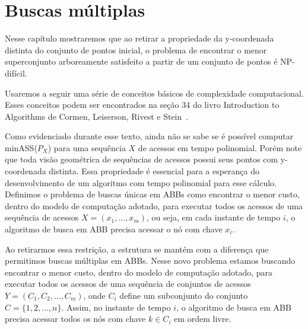 
\chapter{Buscas múltiplas}
\label{cap:buscas-multiplas}




\newtheorem*{kuratowski}{Teorema de Kuratowski (1930)}


Nesse capítulo mostraremos que ao retirar a propriedade da y-coordenada distinta do conjunto de pontos inicial, o problema de encontrar o menor superconjunto arboreamente satisfeito a partir de um conjunto de pontos é NP-difícil. 

Usaremos a seguir uma série de conceitos básicos de complexidade computacional. Esses conceitos podem ser encontrados na seção 34 do livro Introduction to Algorithms de Cormen, Leiserson, Rivest e Stein~\cite{CLRS}.

Como evidenciado durante esse texto, ainda não se sabe se é possível computar minASS($P_X$) para uma sequência $X$ de acessos em tempo polinomial. Porém note que toda visão geométrica de sequências de acessos possui seus pontos com y-coordenada distinta. Essa propriedade é essencial para a esperança do desenvolvimento de um algoritmo com tempo polinomial para esse cálculo. Definimos o problema de buscas únicas em ABBs como encontrar o menor custo, dentro do modelo de computação adotado, para executar todos os acessos de uma sequência de acessos $X = (x_1,\ldots,x_m)$, ou seja, em cada instante de tempo $i$, o algoritmo de busca em ABB precisa acessar o nó com chave $x_i$.

Ao retirarmos essa restrição, a estrutura se mantém com a diferença que permitimos buscas múltiplas em ABBs. Nesse novo problema estamos buscando encontrar o menor custo, dentro do modelo de computação adotado, para executar todos os acessos de uma sequência de conjuntos de acessos $Y = (C_1,C_2,\ldots,C_m)$, onde $C_i$ define um subconjunto do conjunto $C = \{1,2,\ldots,n\}$. Assim, no instante de tempo $i$, o algoritmo de busca em ABB precisa acessar todos os nós com chave $k \in C_i$ em ordem livre.

